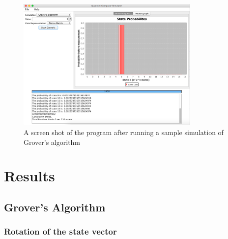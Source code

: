\documentclass[bibliography=totocnumbered, 10pt]{article}
\theoremstyle{NoticeStyle}
\begin{document}
\begin{figure}[H]
\centering
\includegraphics[width=0.8\textwidth]{img/program_example.pdf}
\caption{A screen shot of the program after running a sample simulation of Grover's algorithm}
\end{figure}

%
\section{Results}\label{sec:Results}

\subsection{Grover's Algorithm}\label{sec:Grover}
\subsubsection{Rotation of the state vector}
\end{document}
